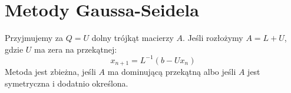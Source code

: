 \section{Metody Gaussa-Seidela}
Przyjmujemy za \( Q = U \) dolny trójkąt macierzy \( A \). Jeśli rozłożymy \( A = L + U \), gdzie \( U \) ma zera na przekątnej:
\[
	x_{n+1} = L^{-1}(b - Ux_n)
\]
Metoda jest zbieżna, jeśli \( A \) ma dominującą przekątną albo jeśli \( A \) jest symetryczna i dodatnio określona.